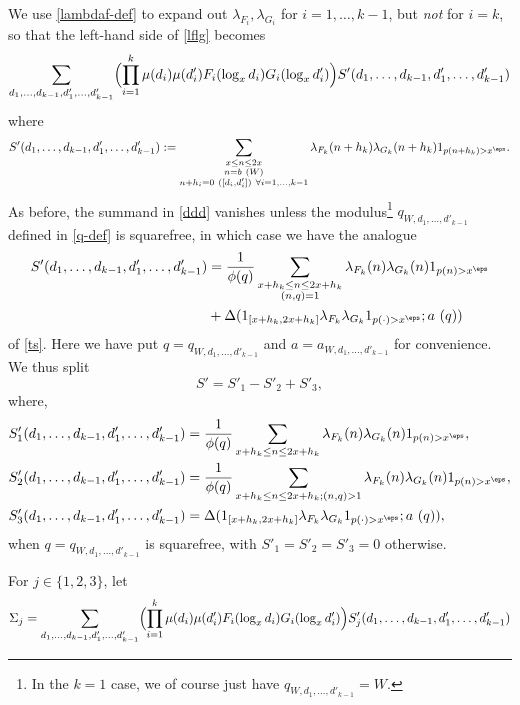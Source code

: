We use \eqref{lambdaf-def} to expand out $\lambda_{F_{i}}, \lambda_{G_{i}}$ for $i=1,\dots,k-1$, but \emph{not} for $i=k$, so that the left-hand side of \eqref{lflg} becomes
\begin{equation}\label{ddd}
 \sum_{d_1,\dots,d_{k-1},d'_1,\dots,d'_{k-1}} \Bigl(\prod_{i=1}^k \mu(d_{i}) \mu(d'_{i}) F_{i}(\log_x d_{i}) G_{i}(\log_x d'_{i}) \Bigr) S'(d_1,\dots,d_{k-1},d'_1,\dots,d'_{k-1})
\end{equation}
where
$$ S'(d_1,\dots,d_{k-1},d'_1,\dots,d'_{k-1}) := 
 \sum_{\substack{x \leq n \leq 2x\\ n = b\ (W) \\ n + h_{i} = 0\ ([d_{i},d'_{i}])\ \forall i=1,\dots,k-1}}
\hspace{0pt minus 1fil}
 \lambda_{F_k}(n+h_k) \lambda_{G_k}(n+h_k) 1_{p(n+h_k) 
> x^\eps}.
$$
As before, the summand in \eqref{ddd} vanishes unless the modulus\footnote{In the $k=1$ case, we of course just have $q_{W,d_1,\dots,d'_{k-1}} = W$.}
$q_{W,d_1,\dots,d'_{k-1}}$ defined in \eqref{q-def} is squarefree, in which case we have the analogue
\begin{align}\label{tsp}
 S'(d_1,\dots,d_{k-1},d'_1,\dots,d'_{k-1}) &= \frac{1}{\phi(q)} \sum_{\substack{x+h_k \leq n \leq 2x+h_k\\ (n,q)=1}} \lambda_{F_k}(n) \lambda_{G_k}(n) 1_{p(n)>x^\eps}\nonumber\\
& + \Delta( 1_{[x+h_k,2x+h_k]} \lambda_{F_k} \lambda_{G_k} 1_{p(\cdot) > x^\eps};  a\ (q))
\end{align}
of \eqref{ts}. Here we have put $q=q_{W,d_1,\dots,d'_{k-1}}$ and $a=a_{W,d_1,\dots,d'_{k-1}}$ for convenience. We thus split
$$ S' = S'_1 - S'_2 + S'_3,$$
where,
\begin{align}
 S'_1(d_1,\dots,d_{k-1},d'_1,\dots,d'_{k-1}) &= \frac{1}{\phi(q)} \sum_{x+h_k \leq n \leq 2x+h_k} \lambda_{F_k}(n) \lambda_{G_k}(n) 1_{p(n)>x^\eps} 
\label{sp1-def},\\
 S'_2(d_1,\dots,d_{k-1},d'_1,\dots,d'_{k-1}) &= \frac{1}{\phi(q)} \sum_{x+h_k \leq n \leq 2x+h_k; (n,q) > 1} \lambda_{F_k}(n) \lambda_{G_k}(n) 1_{p(n)>x^\eps} 
\label{sp2-def},\\
 S'_3(d_1,\dots,d_{k-1},d'_1,\dots,d'_{k-1}) &= \Delta( 1_{[x+h_k,2x+h_k]} \lambda_{F_k} \lambda_{G_k} 1_{p(\cdot) > x^\eps};  a\ (q)),
\label{sp3-def}
\end{align}
when $q=q_{W,d_1,\dots,d'_{k-1}}$ is squarefree, with $S'_1=S'_2=S'_3=0$ otherwise.

For $j\in\{1,2,3\}$, let
\begin{equation}
 \Sigma_j= \sum_{d_1,\dots,d_{k-1},d'_1,\dots,d'_{k-1}}\Bigl(\prod_{i=1}^k \mu(d_{i}) \mu(d'_{i}) F_{i}(\log_x d_{i}) G_{i}(\log_x d'_{i})\Bigr) S'_j(d_1,\dots,d_{k-1},d'_1,\dots,d'_{k-1}) 
\label{eq:SigmaDef}
\end{equation}


